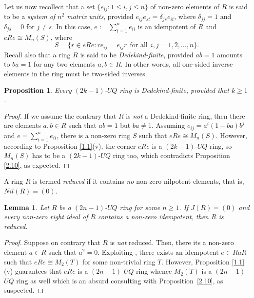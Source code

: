 \documentclass[12pt]{amsart}
\newtheorem{proposition}[theorem]{Proposition}
\newtheorem{lemma}[theorem]{Lemma}
\theoremstyle{definition}
\begin{document}
Let us now recollect that a set $\{e_{ij} : 1 \le i, j \le n\}$ of non-zero elements of $R$ is said to be a {\it system of $n^2$ matrix units}, provided $e_{ij}e_{st} = \delta_{js}e_{it}$, where $\delta_{jj} = 1$ and $\delta_{js} = 0$ for $j \neq s$. In this case, $e := \sum_{i=1}^{n} e_{ii}$ is an idempotent of $R$ and $eRe \cong M_n(S)$, where $$S = \{r \in eRe : re_{ij} = e_{ij}r~~\textrm{for all}~~ i, j = 1, 2, . . . , n\}.$$
Recall also that a ring $R$ is said to be {\it Dedekind-finite}, provided $ab=1$ amounts to $ba=1$ for any two elements $a,b\in R$. In other words, all one-sided inverse elements in the ring must be two-sided inverses.

\begin{proposition}\label{2.11}
Every $(2k-1)$-$UQ$ ring is Dedekind-finite, provided that $k\geq 1$.
\end{proposition}

\begin{proof}
If we assume the contrary that $R$ is {\it not} a Dedekind-finite ring, then there are elements $a, b \in R$ such that $ab = 1$ but $ba \neq 1$. Assuming $e_{ij} = a^i(1-ba)b^j$ and $e =\sum_{i=1}^{n}e_{ii}$, there is a non-zero ring $S$ such that $eRe \cong M_n(S)$. However, according to Proposition \ref{1.1}(v), the corner $eRe$ is a $(2k-1)$-$UQ$ ring, so $M_n(S)$ has to be a $(2k-1)$-$UQ$ ring too, which contradicts Proposition \ref{2.10}, as expected.
\end{proof}

A ring $R$ is termed {\it reduced} if it contains {\it no} non-zero nilpotent elements, that is, $Nil(R) = (0)$.

\begin{lemma}\label{2.12}
Let \(R\) be a $(2n-1)$-$UQ$ ring for some $n\geq 1$. If \(J(R) = (0)\) and every non-zero right ideal of \(R\) contains a non-zero idempotent, then \(R\) is reduced.
\end{lemma}

\begin{proof}
Suppose on contrary that \(R\) is {\it not} reduced. Then, there its a non-zero element \(a \in R\) such that \(a^2 = 0\). Exploiting \cite[Theorem 2.1]{9}, there exists an idempotent \(e \in RaR\) such that \(eRe \cong M_2(T)\) for some non-trivial ring \(T\). However, Proposition \ref{1.1}(v) guarantees that $eRe$ is a $(2n-1)$-$UQ$ ring whence $M_2(T)$ is a $(2n-1)$-$UQ$ ring as well which is an absurd consulting with Proposition~\ref{2.10}, as suspected.
\end{proof}
\end{document}
